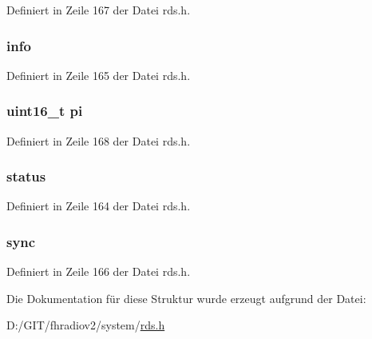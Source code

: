 Definiert in Zeile 167 der Datei rds.\+h.

\hypertarget{structrds_a8936b68dc62d34c0bd4298d71e811a89}{}
\subsubsection[{info}]{ {\bf info}}\label{structrds_a8936b68dc62d34c0bd4298d71e811a89}


Definiert in Zeile 165 der Datei rds.\+h.

\hypertarget{structrds_ad1803744db28ac0d226ec8da9134598e}{}
\subsubsection[{pi}]{\setlength{\rightskip}{0pt plus 5cm}uint16\+\_\+t pi}\label{structrds_ad1803744db28ac0d226ec8da9134598e}


Definiert in Zeile 168 der Datei rds.\+h.

\hypertarget{structrds_a1025e6cbbd3179d2d91b9b4afb8f8efc}{}
\subsubsection[{status}]{ {\bf status}}\label{structrds_a1025e6cbbd3179d2d91b9b4afb8f8efc}


Definiert in Zeile 164 der Datei rds.\+h.

\hypertarget{structrds_aa779e41fc5dcd8e1471033612c290b23}{}
\subsubsection[{sync}]{ {\bf sync}}\label{structrds_aa779e41fc5dcd8e1471033612c290b23}


Definiert in Zeile 166 der Datei rds.\+h.



Die Dokumentation für diese Struktur wurde erzeugt aufgrund der Datei\+:\begin{DoxyCompactItemize}
\item 
D\+:/\+G\+I\+T/fhradiov2/system/\hyperlink{rds_8h}{rds.\+h}\end{DoxyCompactItemize}
